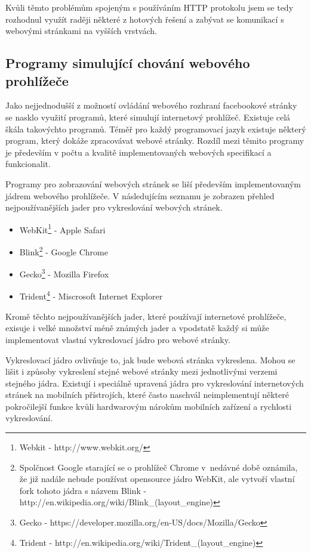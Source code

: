 \documentclass[thesis=M,czech]{FITthesis}[2013/05/10]
\begin{document}
Kvůli těmto problémům spojeným s používáním HTTP protokolu jsem se tedy rozhodnul využít raději některé z hotových řešení a zabývat se komunikací s webovými stránkami na vyšších vrstvách. 

\subsection{Programy simulující chování webového prohlížeče}

Jako nejjednodušší z možností ovládání webového rozhraní facebookové stránky se nasklo využití programů, které simulují internetový prohlížeč. Existuje celá škála takovýchto programů. Téměř pro každý programovací jazyk existuje některý program, který dokáže zpracovávat webové stránky. Rozdíl mezi těmito programy je především v počtu a kvalitě implementovaných webových specifikací a funkcionalit.

Programy pro zobrazování webových stránek se liší především implementovaným jádrem webového prohlížeče. V následujícím seznamu je zobrazen přehled nejpoužívanějších jader pro vykreslování webových stránek.

\begin{itemize}
  \item WebKit\footnote{Webkit - http://www.webkit.org/} - Apple Safari
  \item Blink\footnote{Spolčnost Google starající se o prohlížeč Chrome v~nedávné době oznámila, že již nadále nebude používat opensource jádro WebKit, ale vytvoří vlastní fork tohoto jádra s názvem Blink -  http://en.wikipedia.org/wiki/Blink\_(layout\_engine)} - Google Chrome
  \item Gecko\footnote{Gecko - https://developer.mozilla.org/en-US/docs/Mozilla/Gecko} - Mozilla Firefox
  \item Trident\footnote{Trident - http://en.wikipedia.org/wiki/Trident\_(layout\_engine)} - Miscrosoft Internet Explorer
\end{itemize}
 
Kromě těchto nejpoužívanějších jader, které používají internetové prohlížeče, exisuje i velké množství méně známých jader a vpodstatě každý si může implementovat vlastní vykreslovací jádro pro  webové stránky.

Vykreslovací jádro ovlivňuje to, jak bude webová stránka vykreslena. Mohou se lišit i způsoby vykreslení stejné webové stránky mezi jednotlivými verzemi stejného jádra. Existují i speciálně upravená jádra pro vykreslování internetových stránek na mobilních přístrojích, které často naschvál neimplementují některé pokročilejší funkce kvůli hardwarovým nárokům mobilních zařízení a rychlosti vykreslování.
\end{document}
